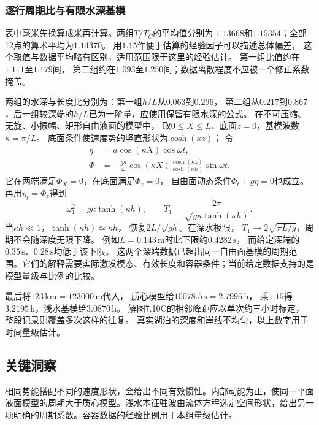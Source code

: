 \documentclass[UTF8,fontset=fandol,a4paper,11pt]{ctexart}
\begin{document}
\subsubsection*{逐行周期比与有限水深基模}
表中毫米先换算成米再计算。两组$T/T_C$的平均值分别为
$1.13668$和$1.15354$；全部12点的算术平均为$1.14370$。
用$1.15$作便于估算的经验因子可以描述总体偏差，
这个取值与数据平均略有区别，适用范围限于这里的经验估计。
第一组比值约在$1.111$至$1.179$间，
第二组约在$1.093$至$1.250$间；数据离散程度不应被一个修正系数掩盖。

两组的水深与长度比分别为：第一组$h/L$从$0.063$到$0.296$，
第二组从$0.217$到$0.867$，后一组较深端的$h/L$已为一阶量，应使用保留有限水深的公式。
在不可压缩、无旋、小振幅、矩形自由液面的模型中，
取$0\le X\le L$、底面$z=0$，基模波数$\kappa=\pi/L$。
底面条件使速度势的竖直形状为$\cosh(\kappa z)$；
令
\[
\begin{aligned}
\eta&=a\cos(\kappa X)\cos\omega t,\\
\Phi&=-\frac{ga}{\omega}\cos(\kappa X)
\frac{\cosh(\kappa z)}{\cosh(\kappa h)}\sin\omega t.
\end{aligned}
\]
它在两端满足$\Phi_X=0$，在底面满足$\Phi_z=0$，
自由面动态条件$\Phi_t+g\eta=0$也成立。
再用$\eta_t=\Phi_z$得到
\[
\omega_1^2=g\kappa\tanh(\kappa h),\qquad
T_1=\frac{2\pi}{\sqrt{g\kappa\tanh(\kappa h)}}.
\]
当$\kappa h\ll1$，$\tanh(\kappa h)\simeq\kappa h$，
恢复$2L/\sqrt{gh}$。在深水极限，
$T_1\to2\sqrt{\pi L/g}$，周期不会随深度无限下降。
例如$L=0.143\,\mathrm m$时此下限约$0.4282\,\mathrm s$，
而给定深端的$0.35\,\mathrm s$、$0.28\,\mathrm s$均低于该下限。
这两个深端数据已超出同一自由面基模的周期范围。它们的解释需要实际激发模态、有效长度和容器条件；当前给定数据支持的是模型量级与比例的比较。

最后将$123\,\mathrm{km}=123000\,\mathrm m$代入，
质心模型给$10078.5\,\mathrm s=2.7996\,\mathrm h$，
乘$1.15$得$3.2195\,\mathrm h$，浅水基模给$3.0870\,\mathrm h$。
解图7.10C的相邻峰距应以单次约三小时标定，
整段记录则覆盖多次这样的往复。
真实湖泊的深度和岸线不均匀，以上数字用于时间量级估计。





\subsection*{关键洞察}

相同势能搭配不同的速度形状，会给出不同有效惯性。内部动能为正，使同一平面液面模型的周期大于质心模型。浅水本征驻波由流体方程选定空间形状，给出另一项明确的周期系数。容器数据的经验比例用于本组量级估计。
\end{document}
